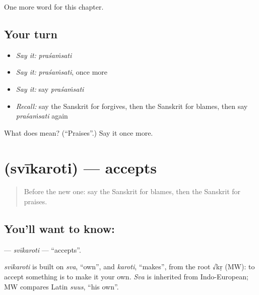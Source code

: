 \begin{grammarlens}[title={What you've built}]
One more word for this chapter.
\end{grammarlens}

\subsection*{Your turn}
\begin{itemize}
\raggedright
  \item \emph{Say it:} \emph{praśaṁsati}
  \item \emph{Say it:} \emph{praśaṁsati}, once more
  \item \emph{Say it:} say \emph{praśaṁsati}
  \item \emph{Recall:} say the Sanskrit for forgives, then the Sanskrit for blames, then say \emph{praśaṁsati} again
\end{itemize}

\begin{tcolorbox}[breakable,colback=teal!4,colframe=teal!35!black,title={Before you move on}]
What does  mean? (\textquotedblleft{}Praises\textquotedblright{}.) Say it once more.
\end{tcolorbox}
\section[\texorpdfstring{\sk{स्वीकरोति} (svīkaroti)}{स्वीकरोति (svīkaroti)}]{ (svīkaroti) — accepts}

\label{lesson:SA-C205-svikaroti}



\begin{quote}
Before the new one: say the Sanskrit for blames, then the Sanskrit for praises.
\end{quote}

\subsection*{You'll want to know: }
\textbf{} — \emph{svīkaroti} — \textquotedblleft{}accepts\textquotedblright{}.

\begin{cousinweb}
\emph{svīkaroti} is built on \emph{sva}, \textquotedblleft{}own\textquotedblright{}, and \emph{karoti}, \textquotedblleft{}makes\textquotedblright{}, from the root √kṛ (MW): to accept something is to make it your own. \emph{Sva} is inherited from Indo-European; MW compares Latin \emph{suus}, \textquotedblleft{}his own\textquotedblright{}.
\end{cousinweb}

